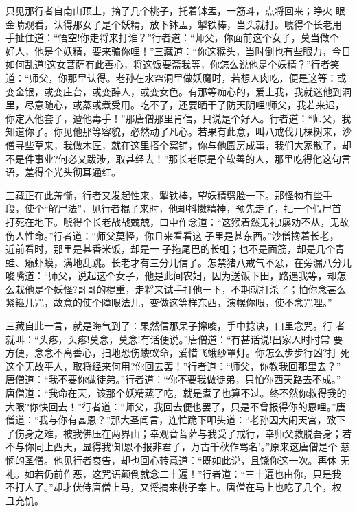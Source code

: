 只见那行者自南山顶上，摘了几个桃子，托着钵盂，一筋斗，点将回来；睁火
眼金睛观看，认得那女子是个妖精，放下钵盂，掣铁棒，当头就打。唬得个长老用
手扯住道：“悟空!你走将来打谁？”行者道：“师父，你面前这个女子，莫当做个
好人，他是个妖精，要来骗你哩！”三藏道：“你这猴头，当时倒也有些眼力，今日
如何乱道!这女菩萨有此善心，将这饭要斋我等，你怎么说他是个妖精？”行者笑
道：“师父，你那里认得。老孙在水帘洞里做妖魔时，若想人肉吃，便是这等：或
变金银，或变庄台，或变醉人，或变女色。有那等痴心的，爱上我，我就迷他到洞
里，尽意随心，或蒸或煮受用。吃不了，还要晒干了防天阴哩!师父，我若来迟，
你定入他套子，遭他毒手！”那唐僧那里肯信，只说是个好人。行者道：“师父，我
知道你了。你见他那等容貌，必然动了凡心。若果有此意，叫八戒伐几棵树来，沙
僧寻些草来，我做木匠，就在这里搭个窝铺，你与他圆房成事，我们大家散了，却
不是件事业?何必又跋涉，取甚经去！”那长老原是个软善的人，那里吃得他这句言
语，羞得个光头彻耳通红。

三藏正在此羞惭，行者又发起性来，掣铁棒，望妖精劈脸一下。那怪物有些手
段，使个“解尸法”，见行者棍子来时，他却抖擞精神，预先走了，把一个假尸首
打死在地下。唬得个长老战战兢兢，口中作念道：“这猴着然无礼!屡劝不从，无故
伤人性命。”行者道：“师父莫怪，你且来看看这子里是甚东西。”沙僧搀着长老，
近前看时，那里是甚香米饭，却是一子拖尾巴的长蛆；也不是面筋，却是几个青
蛙、癞虾蟆，满地乱跳。长老才有三分儿信了。怎禁猪八戒气不忿，在旁漏八分儿
唆嘴道：“师父，说起这个女子，他是此间农妇，因为送饭下田，路遇我等，却怎
么栽他是个妖怪?哥哥的棍重，走将来试手打他一下，不期就打杀了；怕你念甚么
紧箍儿咒，故意的使个障眼法儿，变做这等样东西，演幌你眼，使不念咒哩。”

三藏自此一言，就是晦气到了：果然信那呆子撺唆，手中捻诀，口里念咒。行
者就叫：“头疼，头疼!莫念，莫念!有话便说。”唐僧道：“有甚话说!出家人时时常
要方便，念念不离善心，扫地恐伤蝼蚁命，爱惜飞蛾纱罩灯。你怎么步步行凶?打
死这个无故平人，取将经来何用?你回去罢！”行者道：“师父，你教我回那里去？”
唐僧道：“我不要你做徒弟。”行者道：“你不要我做徒弟，只怕你西天路去不成。”
唐僧道：“我命在天，该那个妖精蒸了吃，就是煮了也算不过。终不然你救得我的
大限?你快回去！”行者道：“师父，我回去便也罢了，只是不曾报得你的恩哩。”唐
僧道：“我与你有甚恩？”那大圣闻言，连忙跪下叩头道：“老孙因大闹天宫，致下
了伤身之难，被我佛压在两界山；幸观音菩萨与我受了戒行，幸师父救脱吾身；若
不与你同上西天，显得我‘知恩不报非君子，万古千秋作骂名’。”原来这唐僧是个
慈悯的圣僧。他见行者哀告，却也回心转意道：“既如此说，且饶你这一次。再休
无礼。如若仍前作恶，这咒语颠倒就念二十遍！”行者道：“三十遍也由你，只是我
不打人了。”却才伏侍唐僧上马，又将摘来桃子奉上。唐僧在马上也吃了几个，权
且充饥。

